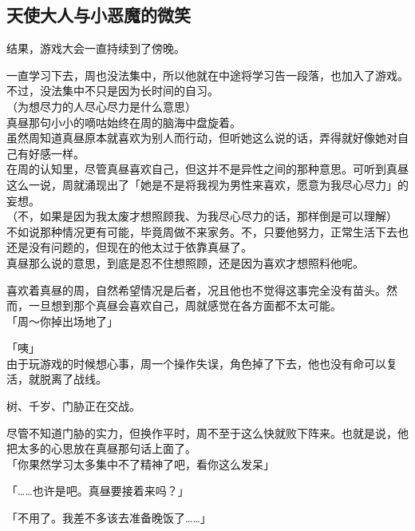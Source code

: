 \subsection{天使大人与小恶魔的微笑}

结果，游戏大会一直持续到了傍晚。

一直学习下去，周也没法集中，所以他就在中途将学习告一段落，也加入了游戏。不过，没法集中不只是因为长时间的自习。\\

（为想尽力的人尽心尽力是什么意思）\\

真昼那句小小的嘀咕始终在周的脑海中盘旋着。\\

虽然周知道真昼原本就喜欢为别人而行动，但听她这么说的话，弄得就好像她对自己有好感一样。\\

在周的认知里，尽管真昼喜欢自己，但这并不是异性之间的那种意思。可听到真昼这么一说，周就涌现出了「她是不是将我视为男性来喜欢，愿意为我尽心尽力」的妄想。\\

（不，如果是因为我太废才想照顾我、为我尽心尽力的话，那样倒是可以理解）\\

不如说那种情况更有可能，毕竟周做不来家务。不，只要他努力，正常生活下去也还是没有问题的，但现在的他太过于依靠真昼了。\\

真昼那么说的意思，到底是忍不住想照顾，还是因为喜欢才想照料他呢。

喜欢着真昼的周，自然希望情况是后者，况且他也不觉得这事完全没有苗头。然而，一旦想到那个真昼会喜欢自己，周就感觉在各方面都不太可能。\\

「周～你掉出场地了」

「咦」\\

由于玩游戏的时候想心事，周一个操作失误，角色掉了下去，他也没有命可以复活，就脱离了战线。

树、千岁、门胁正在交战。

尽管不知道门胁的实力，但换作平时，周不至于这么快就败下阵来。也就是说，他把太多的心思放在真昼那句话上面了。\\

「你果然学习太多集中不了精神了吧，看你这么发呆」

「……也许是吧。真昼要接着来吗？」

「不用了。我差不多该去准备晚饭了……」\\

